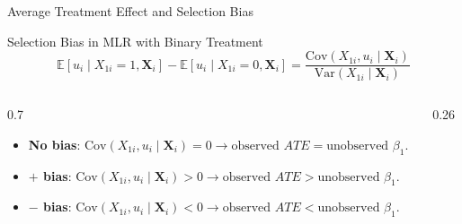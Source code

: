 \documentclass[9pt,aspectratio=169]{beamer}
\newcommand{\E}{\mathbb{E}}
\newcommand{\Var}{\mathrm{Var}}
\newcommand{\Cov}{\mathrm{Cov}}
\begin{document}
\begin{frame}{Average Treatment Effect and Selection Bias}
  \begin{block}{Selection Bias in MLR with Binary Treatment}
    \[
    \E[u_i\mid X_{1i}=1, \boldsymbol{X}_i]-\E[u_i\mid X_{1i}=0, \boldsymbol{X}_i]
    =
    \frac{\Cov(X_{1i},u_i\mid\boldsymbol{X}_i)}{\Var(X_{1i}\mid\boldsymbol{X}_i)}
    \]
  \end{block}
  \vspace{0.7cm}
  \begin{columns}[c]
  \begin{column}{0.7\textwidth}
  \begin{itemize}\setlength{\itemsep}{0.8em}
    \item<1-> \textbf{No bias}: $\mathrm{\Cov}(X_{1i},u_i\mid\boldsymbol{X}_i)=0 \rightarrow \text{observed } ATE= \text{unobserved } \beta_1$.
    \item<2-> \textbf{$+$ bias}: $\mathrm{\Cov}(X_{1i},u_i\mid\boldsymbol{X}_i)>0 \rightarrow \text{observed } ATE> \text{unobserved } \beta_1$.
    \item<3-> \textbf{$-$ bias}: $\mathrm{\Cov}(X_{1i},u_i\mid\boldsymbol{X}_i)<0 \rightarrow \text{observed } ATE< \text{unobserved } \beta_1$.
  \end{itemize}
  \end{column}
  \begin{column}{0.26\textwidth}
  \centering
  \end{column}
  \end{columns}
  \vspace{0.5cm}
\end{frame}
\end{document}
